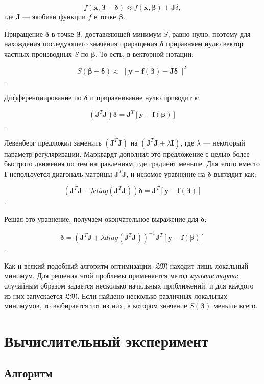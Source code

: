 \documentclass[12pt,a4paper]{amsart}
\begin{document}
\[
f(\mathbf{x}, \mathbf{\beta + \delta}) \approx
	f(\mathbf{x}, \mathbf{\beta}) + \mathbf{J} \delta,
\]
где $\mathbf{J}$ --- якобиан функции $f$ в точке $\mathbf{\beta}$.

Приращение $\mathbf{\delta}$ в точке $\mathbf{\beta}$, доставляющей минимум $S$,
равно нулю, поэтому для нахождения последующего значения приращения $\mathbf{\delta}$
приравняем нулю вектор частных производных $S$ по $\mathbf{\beta}$. То есть,
в векторной нотации:

\[
S(\mathbf{\beta + \delta}) \approx \| \mathbf{y - f (\beta) - J\delta} \|^2
\].

Дифференциирование по $\mathbf{\delta}$ и приравнивание нулю приводит к:

\[
(\mathbf{J}^T\mathbf{J})\mathbf{\delta} = \mathbf{J}^T [\mathbf{y - f(\beta)}]
\].

Левенберг предложил заменить $(\mathbf{J}^T\mathbf{J})$ на
$(\mathbf{J}^T\mathbf{J} + \lambda\mathbf{I})$, где $\lambda$ --- некоторый
параметр регуляризации. Марквардт дополнил это предложение с целью более быстрого
движения по тем направлениям, где градиент меньше. Для этого вместо $\mathbf{I}$
используется диагональ матрицы $\mathbf{J}^T\mathbf{J}$, и искомое уравнение на
$\mathbf{\delta}$ выглядит как:

\[
(\mathbf{J}^T\mathbf{J} + \lambda diag (\mathbf{J}^T\mathbf{J}))\mathbf{\delta} = \mathbf{J}^T [\mathbf{y - f(\beta)}]
\].

Решая это уравнение, получаем окончательное выражение для $\mathbf{\delta}$:

\[
\mathbf{\delta} = (\mathbf{J}^T\mathbf{J} + \lambda diag (\mathbf{J}^T\mathbf{J}))^{-1} \mathbf{J}^T [\mathbf{y - f(\beta)}]
\].

Как и всякий подобный алгоритм оптимизации, $\mathfrak{LM}$ находит лишь
локальный минимум. Для решения этой проблемы применяется метод \emph{мультистарта}:
случайным образом задается несколько начальных приближений, и для каждого из
них запускается $\mathfrak{LM}$. Если найдено несколько различных локальных
минимумов, то выбирается тот из них, в котором значение $S(\mathbf{\beta})$
меньше всего.

\section{Вычислительный эксперимент}

\subsection{Алгоритм}
\end{document}
